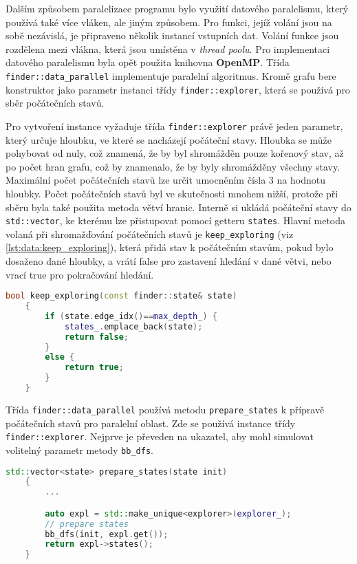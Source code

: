 Dalším způsobem paralelizace programu bylo využití datového paralelismu, který používá také více vláken, ale jiným způsobem.
Pro funkci, jejíž volání jsou na sobě nezávislá, je připraveno několik instancí vstupních dat.
Volání funkce jsou rozdělena mezi vlákna, která jsou umístěna v \textit{thread poolu}.
Pro implementaci datového paralelismu byla opět použita knihovna \textbf{OpenMP}.
Třída \texttt{finder::data\_parallel} implementuje paralelní algoritmus.
Kromě grafu bere konstruktor jako parametr instanci třídy \texttt{finder::explorer}, která se používá pro sběr počátečních stavů. 

Pro vytvoření instance vyžaduje třída \texttt{finder::explorer}  právě jeden parametr, který určuje hloubku, ve které se nacházejí počáteční stavy.
Hloubka se může pohybovat od nuly, což znamená, že by byl shromážděn pouze kořenový stav, až po počet hran grafu, což by znamenalo, že by byly shromážděny všechny stavy.
Maximální počet počátečních stavů lze určit umocněním čísla 3 na hodnotu hloubky.
Počet počátečních stavů byl ve skutečnosti mnohem nižší, protože při sběru byla také použita metoda větví hranic.
Interně si ukládá počáteční stavy do \texttt{std::vector}, ke kterému lze přistupovat pomocí getteru \texttt{states}.
Hlavní metoda volaná při shromažďování počátečních stavů je \texttt{keep\_exploring} (viz \ref{lst:data:keep_exploring}), která přidá stav k počátečním stavům, pokud bylo dosaženo dané hloubky, a vrátí false pro zastavení hledání v dané větvi, nebo vrací true pro pokračování hledání.

\begin{lstlisting}[language=C++, label={lst:data:keep_exploring}, title={Metoda pro řízení prohledávání}]
    bool keep_exploring(const finder::state& state)
    {
        if (state.edge_idx()==max_depth_) {
            states_.emplace_back(state);
            return false;
        }
        else {
            return true;
        }
    }
\end{lstlisting}

Třída \texttt{finder::data\_parallel} používá metodu \texttt{prepare\_states} k přípravě počátečních stavů pro paralelní oblast.
Zde se používá instance třídy \texttt{finder::explorer}.
Nejprve je převeden na ukazatel, aby mohl simulovat volitelný parametr metody \texttt{bb\_dfs}.

\begin{lstlisting}[language=C++, label={lst:data:prepare_states}, title={Metoda pro přípravu počátečních stavů}]
    std::vector<state> prepare_states(state init)
    {
        ...

        auto expl = std::make_unique<explorer>(explorer_);
        // prepare states
        bb_dfs(init, expl.get());
        return expl->states();
    }
\end{lstlisting}

